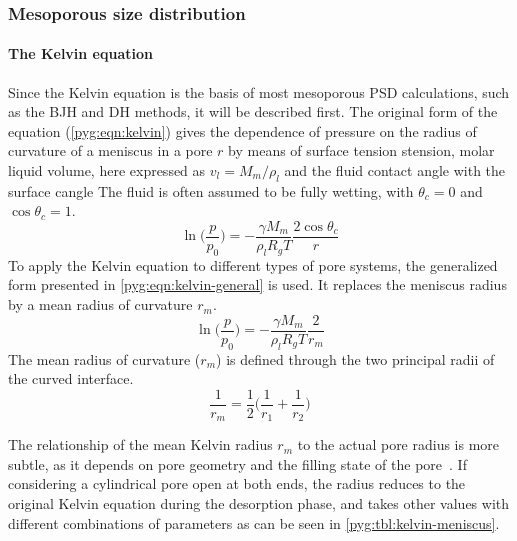 \subsubsection{Mesoporous size distribution}

\paragraph{The Kelvin equation}

Since the Kelvin equation is the basis of most mesoporous PSD
calculations, such as the \gls{BJH} and \gls{DH} methods, it will be described
first. The original form of the equation (\autoref{pyg:eqn:kelvin})
gives the dependence of pressure on the radius of curvature of a
meniscus in a pore \(r\) by means of surface tension \gls{stension},
molar liquid volume, here expressed as \(v_l=M_m/\rho_l\) and the
fluid contact angle with the surface \gls{cangle}
The fluid is often assumed to be fully wetting, with
\(\theta_c=0\) and \(\cos\theta_c=1\).
%
\begin{equation}\label{pyg:eqn:kelvin}
	\ln\Big(\frac{p}{p_0}\Big) = -\frac{\gamma M_m}{\rho_l R_gT}\frac{2 \cos\theta_c}{r}
\end{equation}
%
To apply the Kelvin equation to different types of pore systems, the
generalized form presented in \autoref{pyg:eqn:kelvin-general}
is used. It replaces the meniscus radius by a mean radius of curvature
\(r_m\).
%
\begin{equation}\label{pyg:eqn:kelvin-general}
	\ln\Big(\frac{p}{p_0}\Big) = -\frac{\gamma M_m}{\rho_l R_gT}\frac{2}{r_m}
\end{equation}
%
The mean radius of curvature (\(r_m\)) is defined through the two principal
radii of the curved interface.
%
\begin{equation}\label{pyg:eqn:kelvin-mradius}
	\frac{1}{r_m} = \frac{1}{2}\Big(\frac{1}{r_1}+\frac{1}{r_2}\Big)
\end{equation}

The relationship of the mean Kelvin radius \(r_m\) to the actual pore
radius is more subtle, as it depends on pore geometry and the
filling state of the pore~\cite{doAdsorptionAnalysisEquilibria1998}.
If considering a cylindrical pore open at both ends, the radius reduces
to the original Kelvin equation during the desorption phase, and takes
other values with different combinations of parameters
as can be seen in \autoref{pyg:tbl:kelvin-meniscus}.

